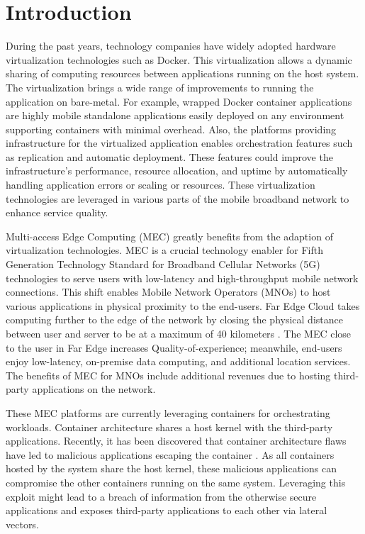 \chapter{Introduction}
\label{chapter:intro}

During the past years, technology companies have widely adopted hardware virtualization technologies such as Docker. This virtualization allows a dynamic sharing of computing resources between applications running on the host system. The virtualization brings a wide range of improvements to running the application on bare-metal. For example, wrapped Docker container applications are highly mobile standalone applications easily deployed on any environment supporting containers with minimal overhead. Also, the platforms providing infrastructure for the virtualized application enables orchestration features such as replication and automatic deployment. These features could improve the infrastructure's performance, resource allocation, and uptime by automatically handling application errors or scaling or resources. These virtualization technologies are leveraged in various parts of the mobile broadband network to enhance service quality.

Multi-access Edge Computing (MEC) greatly benefits from the adaption of virtualization technologies. MEC is a crucial technology enabler for Fifth Generation Technology Standard for Broadband Cellular Networks (5G) technologies to serve users with low-latency and high-throughput mobile network connections. This shift enables Mobile Network Operators (MNOs) to host various applications in physical proximity to the end-users. Far Edge Cloud takes computing further to the edge of the network by closing the physical distance between user and server to be at a maximum of 40 kilometers \cite{AirFrameOpenEdgeServer}. The MEC close to the user in Far Edge increases Quality-of-experience; meanwhile, end-users enjoy low-latency, on-premise data computing, and additional location services. The benefits of MEC for MNOs include additional revenues due to hosting third-party applications on the network.

These MEC platforms are currently leveraging containers for orchestrating workloads. Container architecture shares a host kernel with the third-party applications. Recently, it has been discovered that container architecture flaws have led to malicious applications escaping the container \cite{CVE-2019-5736}\cite{CVE-2020-14386}. As all containers hosted by the system share the host kernel, these malicious applications can compromise the other containers running on the same system. Leveraging this exploit might lead to a breach of information from the otherwise secure applications and exposes third-party applications to each other via lateral vectors.

